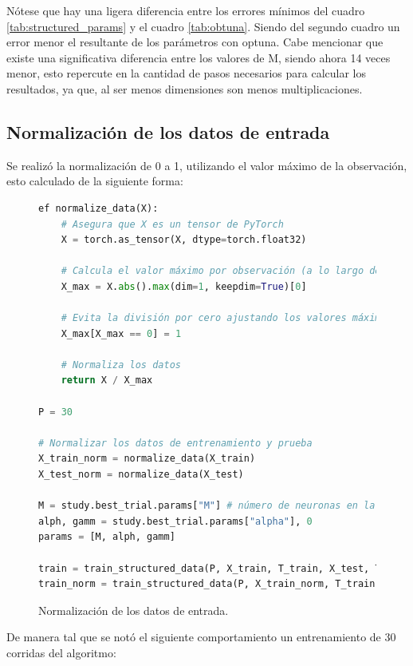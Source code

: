 \documentclass{article}
\begin{document}
Nótese que hay una ligera diferencia entre los errores mínimos del cuadro \ref{tab:structured_params} y el cuadro \ref{tab:obtuna}. Siendo  del segundo cuadro un error menor el resultante de los parámetros con optuna. Cabe mencionar que existe una significativa diferencia entre los valores de M, siendo ahora 14 veces menor, esto repercute en la cantidad de pasos necesarios para calcular los resultados, ya que, al ser menos dimensiones son menos multiplicaciones.

\newpage
\subsection{Normalización de los datos de entrada}

Se realizó la normalización de 0 a 1, utilizando el valor máximo de la observación, esto calculado de la siguiente forma:

\begin{figure}[htbp]
    \centering
    \begin{lstlisting}[language=Python, texcl=True]
ef normalize_data(X):
    # Asegura que X es un tensor de PyTorch
    X = torch.as_tensor(X, dtype=torch.float32)
    
    # Calcula el valor máximo por observación (a lo largo de cada fila si X es una matriz 2D)
    X_max = X.abs().max(dim=1, keepdim=True)[0]
    
    # Evita la división por cero ajustando los valores máximos que sean cero a uno
    X_max[X_max == 0] = 1
    
    # Normaliza los datos
    return X / X_max

P = 30

# Normalizar los datos de entrenamiento y prueba
X_train_norm = normalize_data(X_train)
X_test_norm = normalize_data(X_test)

M = study.best_trial.params["M"] # número de neuronas en la capa oculta
alph, gamm = study.best_trial.params["alpha"], 0
params = [M, alph, gamm]

train = train_structured_data(P, X_train, T_train, X_test, T_test, params, print_e=False)
train_norm = train_structured_data(P, X_train_norm, T_train, X_test_norm, T_test, params, print_e=False)
    \end{lstlisting}
    \caption{Normalización de los datos de entrada.}
    \label{fig:nomr}
\end{figure}


De manera tal que se notó el siguiente comportamiento un entrenamiento de 30 corridas del algoritmo: 
\end{document}
